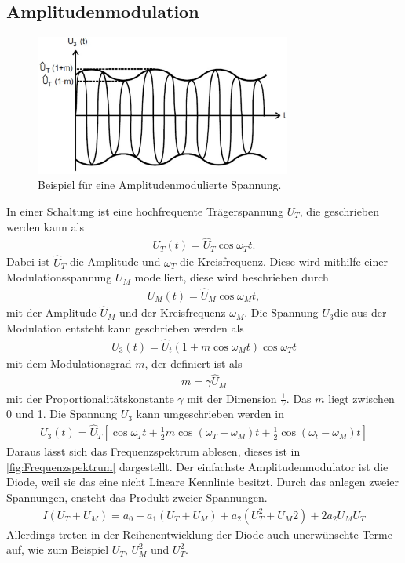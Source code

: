 \subsection{Amplitudenmodulation}
\begin{figure}[h!]
	\centering
	\includegraphics[width = 0.75\textwidth]{../Grafiken/Frequenzbaender.pdf}
	\caption{Beispiel für eine Amplitudenmodulierte Spannung.\label{fig:modulationsgrad_amplitude}\cite{V59}}
\end{figure}
In einer Schaltung ist eine hochfrequente Trägerspannung $U_T$, die geschrieben werden kann als
\begin{align}
	U_T(t)=\hat U_T\cos\omega_Tt.
\end{align}
Dabei ist $\hat U_T$ die Amplitude und $\omega_T$ die Kreisfrequenz.
Diese wird mithilfe einer Modulationsspannung $U_M$ modelliert, diese wird beschrieben durch
\begin{align}
	U_M(t)=\hat U_M\cos\omega_Mt,
\end{align}
mit der Amplitude $\hat U_M$ und der Kreisfrequenz $\omega_M$.
Die Spannung $U_3$die aus der Modulation entsteht kann geschrieben werden als
\begin{align}
	U_3(t)=\hat U_t\left(1+m\cos\omega_Mt\right)\cos \omega_Tt
\end{align}
mit dem Modulationsgrad $m$, der definiert ist als 
\begin{align}
	m = \gamma \hat U_M
\end{align}
mit der Proportionalitätskonstante $\gamma$ mit der Dimension $\frac{1}{V}$.
Das $m$ liegt zwischen 0 und 1.
Die Spannung $U_3$ kann umgeschrieben werden in
\begin{align}
	U_3(t)=\hat U_T\left[\cos\omega_Tt+\frac{1}{2}m\cos\left(\omega_T+\omega_M\right)t+\frac{1}{2}\cos\left(\omega_t-\omega_M\right)t\right]
\end{align}
Daraus lässt sich das Frequenzspektrum ablesen, dieses ist in \cref{fig:Frequenzspektrum} dargestellt.
Der einfachste Amplitudenmodulator ist die Diode, weil sie das eine nicht Lineare Kennlinie besitzt.
Durch das anlegen zweier Spannungen, ensteht das Produkt zweier Spannungen. 
\begin{align}
	I(U_T+U_M)=a_0+a_1(U_T+U_M)+a_2\left(U_T^2+U_M 2\right)+2a_2U_MU_T
\end{align}
Allerdings treten in der Reihenentwicklung der Diode auch unerwünschte Terme auf, wie zum Beispiel $U_T$, $U_M^2$ und $U_T^2$.

